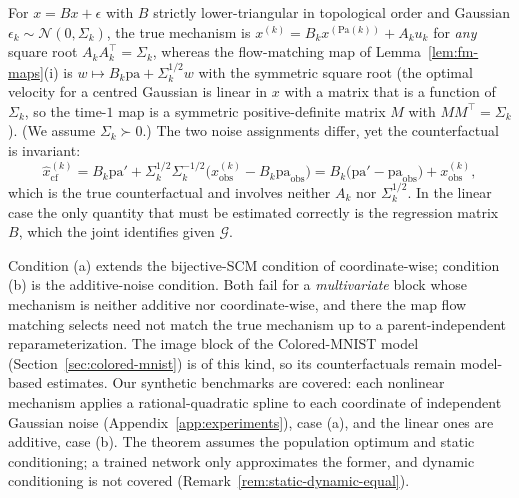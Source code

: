 \begin{remark}
\label{rem:linear-explicit}
For $x = Bx + \epsilon$ with $B$ strictly lower-triangular in topological order and Gaussian
$\epsilon_k \sim \mathcal{N}(0, \Sigma_k)$, the true mechanism is
$x^{(k)} = B_k x^{(\mathrm{Pa}(k))} + A_k u_k$ for \emph{any} square root
$A_kA_k^\top = \Sigma_k$, whereas the flow-matching map of Lemma~\ref{lem:fm-maps}(i) is
$w \mapsto B_k \mathrm{pa} + \Sigma_k^{1/2} w$ with the symmetric square root (the optimal
velocity for a centred Gaussian is linear in $x$ with a matrix that is a function of
$\Sigma_k$, so the time-$1$ map is a symmetric positive-definite matrix $M$ with
$MM^\top = \Sigma_k$). (We assume $\Sigma_k \succ 0$.) The two noise assignments differ, yet the counterfactual is invariant:
\begin{equation}
  \hat x^{(k)}_{\mathrm{cf}}
  = B_k \mathrm{pa}' + \Sigma_k^{1/2} \Sigma_k^{-1/2}\bigl(x^{(k)}_{\mathrm{obs}} - B_k \mathrm{pa}_{\mathrm{obs}}\bigr)
  = B_k\bigl(\mathrm{pa}' - \mathrm{pa}_{\mathrm{obs}}\bigr) + x^{(k)}_{\mathrm{obs}},
\end{equation}
which is the true counterfactual and involves neither $A_k$ nor $\Sigma_k^{1/2}$. In the
linear case the only quantity that must be estimated correctly is the regression matrix $B$,
which the joint identifies given $\mathcal{G}$.
\end{remark}

\begin{remark}
\label{rem:l3-limits}
Condition (a) extends the bijective-SCM condition of \citet{nasresfahany2023bijective}
coordinate-wise; condition (b) is the additive-noise condition. Both fail for a
\emph{multivariate} block whose mechanism is neither additive nor coordinate-wise, and
there the map flow matching selects need not match the true mechanism up to a
parent-independent reparameterization. The image block of the Colored-MNIST model
(Section~\ref{sec:colored-mnist}) is of this kind, so its counterfactuals remain model-based
estimates. Our synthetic benchmarks are covered: each nonlinear mechanism applies a
rational-quadratic spline to each coordinate of independent Gaussian noise
(Appendix~\ref{app:experiments}), case (a), and the linear ones are additive, case (b).
The theorem assumes the population optimum and static conditioning; a trained network only
approximates the former, and dynamic conditioning is not covered
(Remark~\ref{rem:static-dynamic-equal}).
\end{remark}

